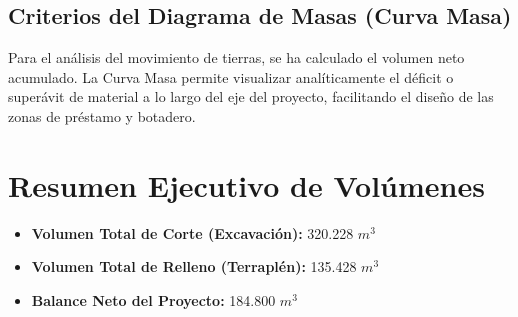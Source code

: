 \documentclass[11pt,letterpaper]{article}
\begin{document}
\subsection{Criterios del Diagrama de Masas (Curva Masa)}
Para el análisis del movimiento de tierras, se ha calculado el volumen neto acumulado. La Curva Masa permite visualizar analíticamente el déficit o superávit de material a lo largo del eje del proyecto, facilitando el diseño de las zonas de préstamo y botadero.
\section{Resumen Ejecutivo de Volúmenes}
\begin{itemize}
  \item \textbf{Volumen Total de Corte (Excavación):} 320.228 $m^3$
  \item \textbf{Volumen Total de Relleno (Terraplén):} 135.428 $m^3$
  \item \textbf{Balance Neto del Proyecto:} 184.800 $m^3$
\end{itemize}
\end{document}
